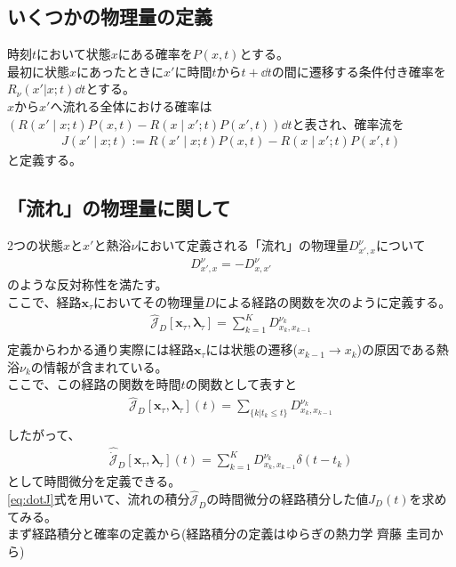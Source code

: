 \documentclass{ltjsarticle}
\begin{document}
\subsection{いくつかの物理量の定義}
時刻$t$において状態$x$にある確率を$P(x,t)$とする。\\
最初に状態$x$にあったときに$x'$に時間$t$から$t+\dd{t}$の間に遷移する条件付き確率を$R_\nu(x'|x;t)\dd{t}$とする。\\
$x$から$x'$へ流れる全体における確率は$\left( R(x'\mid x;t)P(x,t)-R(x\mid x';t)P(x',t) \right)\dd{t} $と表され、確率流を
\begin{align}
  J(x'\mid x;t):=R(x'\mid x;t)P(x,t)-R(x\mid x';t)P(x',t)
\end{align}
と定義する。\\
\subsection{「流れ」の物理量に関して}
2つの状態$x$と$x'$と熱浴$\nu$において定義される「流れ」の物理量$D^\nu_{x',x}$について\\
\begin{align}
  D^\nu_{x',x}=-D^\nu_{x,x'}
\end{align}
のような反対称性を満たす。\\
ここで、経路$\bm{x}_\tau$においてその物理量$D$による経路の関数を次のように定義する。
\begin{align}
  \hat{\mathcal{J}}_D[\bm{x}_\tau,\bm{\lambda}_\tau]=\sum^K_{k=1}D^{\nu_k}_{x_k,x_{k-1}}\\
\end{align}
定義からわかる通り実際には経路$\bm{x}_\tau$には状態の遷移($x_{k-1}\to x_k$)の原因である熱浴$\nu_k$の情報が含まれている。\\
ここで、この経路の関数を時間$t$の関数として表すと
\begin{align}
  \hat{\mathcal{J}}_D[\bm{x}_\tau,\bm{\lambda}_\tau](t)=\sum_{\lbrace k|t_k \le t\rbrace}D^{\nu_k}_{x_k,x_{k-1}}\\
\end{align}
したがって、
\begin{align}
  \hat{\dot{\mathcal{J}}}_D[\bm{x}_\tau,\bm{\lambda}_\tau](t)=\sum_{k=1}^K D^{\nu_k}_{x_{k},x_{k-1}}\delta(t-t_k)\label{eq:dotJ}
\end{align}
として時間微分を定義できる。\\
\eqref{eq:dotJ}式を用いて、流れの積分$\hat{\mathcal{J}}_D$の時間微分の経路積分した値$J_D(t)$を求めてみる。\\
まず経路積分と確率の定義から(経路積分の定義はゆらぎの熱力学 齊藤 圭司から)\\
\end{document}
